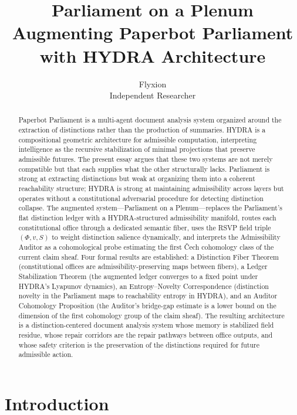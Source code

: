 \documentclass[12pt, a4paper]{article}
\title{\textbf{Parliament on a Plenum}\\[0.4em]
\large Augmenting Paperbot Parliament with HYDRA Architecture}
\author{Flyxion\\Independent Researcher}
\date{}
\theoremstyle{plain}
\theoremstyle{definition}
\theoremstyle{remark}
\begin{document}
\maketitle

\begin{abstract}
Paperbot Parliament is a multi-agent document analysis system organized around the extraction of distinctions rather than the production of summaries. HYDRA is a compositional geometric architecture for admissible computation, interpreting intelligence as the recursive stabilization of minimal projections that preserve admissible futures. The present essay argues that these two systems are not merely compatible but that each supplies what the other structurally lacks. Parliament is strong at extracting distinctions but weak at organizing them into a coherent reachability structure; HYDRA is strong at maintaining admissibility across layers but operates without a constitutional adversarial procedure for detecting distinction collapse. The augmented system---Parliament on a Plenum---replaces the Parliament's flat distinction ledger with a HYDRA-structured admissibility manifold, routes each constitutional office through a dedicated semantic fiber, uses the RSVP field triple $(\Phi, v, S)$ to weight distinction salience dynamically, and interprets the Admissibility Auditor as a cohomological probe estimating the first \v{C}ech cohomology class of the current claim sheaf. Four formal results are established: a Distinction Fiber Theorem (constitutional offices are admissibility-preserving maps between fibers), a Ledger Stabilization Theorem (the augmented ledger converges to a fixed point under HYDRA's Lyapunov dynamics), an Entropy--Novelty Correspondence (distinction novelty in the Parliament maps to reachability entropy in HYDRA), and an Auditor Cohomology Proposition (the Auditor's bridge-gap estimate is a lower bound on the dimension of the first cohomology group of the claim sheaf). The resulting architecture is a distinction-centered document analysis system whose memory is stabilized field residue, whose repair corridors are the repair pathways between office outputs, and whose safety criterion is the preservation of the distinctions required for future admissible action.
\end{abstract}

\newpage

\section{Introduction}
\end{document}
